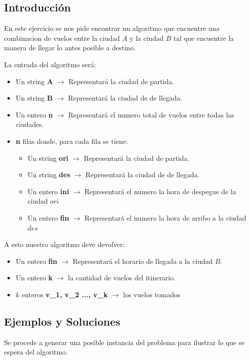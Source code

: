 \subsection{Introducci\'on} 

En este ejercicio se nos pide encontrar un algoritmo que encuentre una combinacion de vuelos entre la ciudad $A$ y la ciudad $B$ tal que encuentre la manera de llegar lo antes posible a destino.

La entrada del algoritmo ser\'a:

\begin{itemize}
\item Un string \textbf{A} $\rightarrow$ Representar\'a la ciudad de partida.
\item Un string \textbf{B} $\rightarrow$ Representar\'a la ciudad de de llegada.
\item Un entero \textbf{n} $\rightarrow$ Representar\'a el numero total de vuelos entre todas las ciudades.
\item \textbf{n} filas donde, para cada fila se tiene:
\begin{itemize}
\item Un string \textbf{ori} $\rightarrow$ Representar\'a la ciudad de partida.
\item Un string \textbf{des} $\rightarrow$ Representar\'a la ciudad de de llegada.
\item Un entero \textbf{ini} $\rightarrow$ Representar\'a el numero la hora de despegue de la ciudad $ori$
\item Un entero \textbf{fin} $\rightarrow$ Representar\'a el numero la hora de arribo a la ciudad $des$
\end{itemize}
\end{itemize}

A esto nuestro algoritmo deve devolver:
\begin{itemize}
\item Un entero \textbf{fin} $\rightarrow$ Representar\'a el horario de llegada a la ciudad $B$.
\item Un entero \textbf{k} $\rightarrow$ la cantidad de vuelos del itinerario.
\item $k$ enteros \textbf{v_1, v_2 ..., v_k} $\rightarrow$ los vuelos tomados
\end{itemize}

\subsection{Ejemplos y Soluciones}
Se procede a generar una posible instancia del problema para ilustrar lo que se espera del algoritmo.

